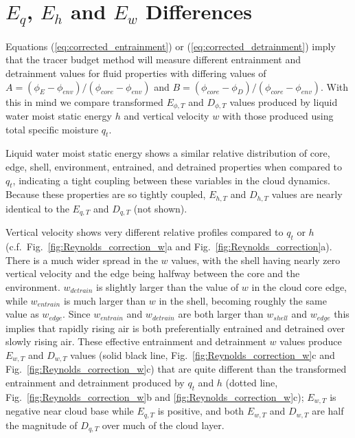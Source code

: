 \documentclass[12pt]{article}
\begin{document}

\section{$E_q$, $E_h$ and $E_w$ Differences}

Equations (\ref{eq:corrected_entrainment}) or 
(\ref{eq:corrected_detrainment}) imply that the tracer budget method will 
measure different entrainment and detrainment values for fluid properties 
with differing values of 
$A = (\phi_E - \phi_{env})/(\phi_{core} - \phi_{env})$ and
$B = (\phi_{core} - \phi_D)/(\phi_{core} - \phi_{env})$.  With this in 
mind we compare transformed $E_{\phi,T}$ and $D_{\phi,T}$ values 
produced by liquid water moist static energy $h$ and vertical velocity 
$w$ with those produced using total specific moisture $q_t$.

Liquid water moist static energy shows a similar relative distribution of 
core, edge, shell, environment, entrained, and detrained properties when 
compared to $q_t$, indicating a tight coupling between these variables in 
the cloud dynamics.  Because these properties are so tightly coupled, 
$E_{h,T}$ and $D_{h,T}$ values are nearly identical to the $E_{q,T}$ and 
$D_{q,T}$ (not shown).

Vertical velocity shows very different relative profiles compared to
$q_t$ or $h$ (c.f.~Fig.~\ref{fig:Reynolds_correction_w}a and 
Fig.~\ref{fig:Reynolds_correction}a).  There is a
much wider spread in the $w$ values, with the shell having nearly zero
vertical velocity and the edge being halfway between the core and the
environment.  $w_{detrain}$ is slightly larger than the value of $w$
in the cloud core edge, while $w_{entrain}$ is much larger than $w$ in
the shell, becoming roughly the same value as $w_{edge}$.  Since
$w_{entrain}$ and $w_{detrain}$ are both larger than $w_{shell}$ and
$w_{edge}$ this implies that rapidly rising air is both preferentially
entrained and detrained over slowly rising air.  These effective
entrainment and detrainment $w$ values produce $E_{w,T}$ and $D_{w,T}$
values (solid black line, Fig.~\ref{fig:Reynolds_correction_w}c and 
Fig.~\ref{fig:Reynolds_correction_w}c) that are quite different than the 
transformed entrainment and detrainment produced by $q_t$ and $h$
(dotted line, Fig.~\ref{fig:Reynolds_correction_w}b and 
\ref{fig:Reynolds_correction_w}c); $E_{w,T}$ is negative near cloud base
while $E_{q,T}$ is positive, and both $E_{w,T}$ and $D_{w,T}$ are half 
the magnitude of $D_{q,T}$ over much of the cloud layer.
\end{document}
